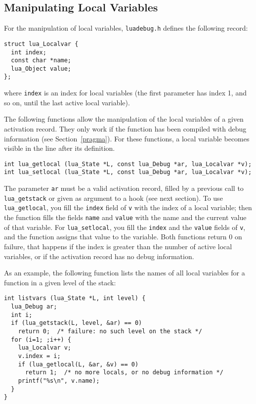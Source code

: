 \documentclass[11pt]{article}
\newcommand{\See}[1]{Section~\ref{#1}}
\newcommand{\see}[1]{(see \See{#1})}
\newcommand{\Deffunc}[1]{\index{#1}}
\begin{document}
\subsection{Manipulating Local Variables}

For the manipulation of local variables,
\verb|luadebug.h| defines the following record:
\begin{verbatim}
struct lua_Localvar {
  int index;
  const char *name;
  lua_Object value;
};
\end{verbatim}
where \verb|index| is an index for local variables
(the first parameter has index 1, and so on,
until the last active local variable).

\Deffunc{lua_getlocal}\Deffunc{lua_setlocal}
The following functions allow the manipulation of the
local variables of a given activation record.
They only work if the function has been compiled with debug
information \see{pragma}.
For these functions, a local variable becomes
visible in the line after its definition.
\begin{verbatim}
int lua_getlocal (lua_State *L, const lua_Debug *ar, lua_Localvar *v);
int lua_setlocal (lua_State *L, const lua_Debug *ar, lua_Localvar *v);
\end{verbatim}
The parameter \verb|ar| must be a valid activation record,
filled by a previous call to \verb|lua_getstack| or
given as argument to a hook (see next section).
To use \verb|lua_getlocal|,
you fill the \verb|index| field of \verb|v| with the index
of a local variable; then the function fills the fields
\verb|name| and \verb|value| with the name and the current
value of that variable.
For \verb|lua_setlocal|,
you fill the \verb|index| and the \verb|value| fields of \verb|v|,
and the function assigns that value to the variable.
Both functions return 0 on failure, that happens
if the index is greater than the number of active local variables,
or if the activation record has no debug information.

As an example, the following function lists the names of all
local variables for a function in a given level of the stack:
\begin{verbatim}
int listvars (lua_State *L, int level) {
  lua_Debug ar;
  int i;
  if (lua_getstack(L, level, &ar) == 0)
    return 0;  /* failure: no such level on the stack */
  for (i=1; ;i++) {
    lua_Localvar v;
    v.index = i;
    if (lua_getlocal(L, &ar, &v) == 0)
      return 1;  /* no more locals, or no debug information */
    printf("%s\n", v.name);
  }
}
\end{verbatim}
\end{document}
